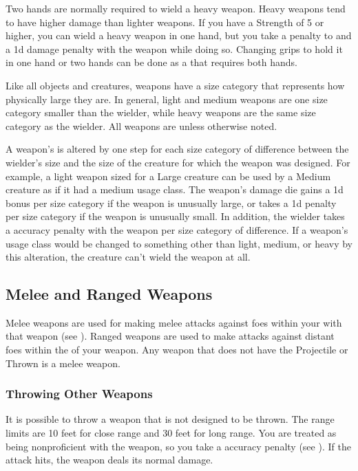          Two hands are normally required to wield a heavy weapon.
        Heavy weapons tend to have higher damage than lighter weapons.
        If you have a Strength of 5 or higher, you can wield a heavy weapon in one hand, but you take a  penalty to  and a \minus1d damage penalty with the weapon while doing so.
        Changing grips to hold it in one hand or two hands can be done as a  that requires both hands.

         Like all objects and creatures, weapons have a size category that represents how physically large they are. In general, light and medium weapons are one size category smaller than the wielder, while heavy weapons are the same size category as the wielder.
        All weapons are  unless otherwise noted.

        \label{Inappropriately Sized Weapons} A weapon's  is altered by one step for each size category of difference between the wielder's size and the size of the creature for which the weapon was designed.
        For example, a light weapon sized for a Large creature can be used by a Medium creature as if it had a medium usage class.
        The weapon's damage die gains a \plus1d bonus per size category if the weapon is unusually large, or takes a \minus1d penalty per size category if the weapon is unusually small.
        In addition, the wielder takes a  accuracy penalty with the weapon per size category of difference.
        If a weapon's usage class would be changed to something other than light, medium, or heavy by this alteration, the creature can't wield the weapon at all.

    \subsection{Melee and Ranged Weapons}
        Melee weapons are used for making melee attacks against foes within your  with that weapon (see ).
        Ranged weapons are used to make attacks against distant foes within the  of your weapon.
        Any weapon that does not have the Projectile or Thrown  is a melee weapon.

            \subsubsection{Throwing Other Weapons} It is possible to throw a weapon that is not designed to be thrown.
            The range limits are 10 feet for close range and 30 feet for long range.
            You are treated as being nonproficient with the weapon, so you take a  accuracy penalty (see ).
            If the attack hits, the weapon deals its normal damage.

